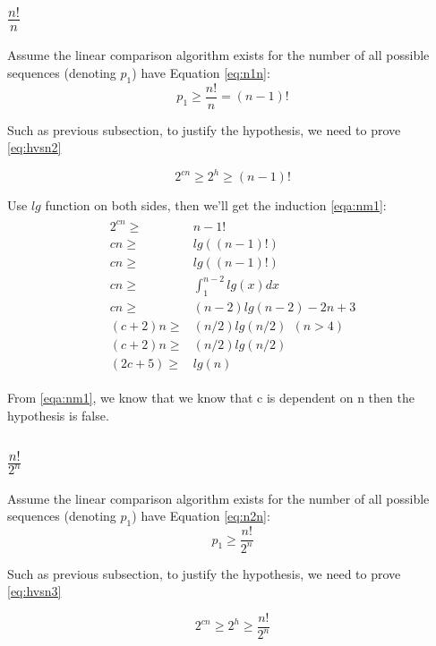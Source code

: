 \documentclass[oneside]{homework} %
\begin{document}
\subsection{$\frac{n!}{n}$}

Assume the linear comparison algorithm exists for the number of all possible sequences (denoting $p_{1}$) have Equation \ref{eq:n1n}:
\begin{equation}
  \label{eq:n1n}
  p_{1}\geq\frac{n!}{n} =  (n-1)!
\end{equation}

Such as previous subsection, to justify the hypothesis, we need to prove \ref{eq:hvsn2}

\begin{equation}
  2^{cn} \geq 2^{h} \geq (n-1)!
  \label{eq:hvsn2}
\end{equation}

Use $lg$ function on both sides, then we'll get the induction \ref{eqa:nm1}:
\begin{eqnarray}
  \begin{split}
	2^{cn} \geq& n-1! \\
	cn \geq& lg((n-1)!) \\
	cn \geq& lg((n-1)!) \\
	cn \geq& \int_{1}^{n-2}lg(x)dx  \\
	cn \geq& (n-2)lg(n-2) - 2n +3 \\
	(c+2)n \geq& (n/2)lg(n/2) ~ ~ (n>4)\\
	(c+2)n \geq& (n/2)lg(n/2) \\
	(2c+5) \geq& lg(n)
  \end{split}
  \label{eqa:nm1}
\end{eqnarray}

From \ref{eqa:nm1}, we know that we know that c is dependent on n then the hypothesis is false.

\subsection{$\frac{n!}{2^{n}}$}

Assume the linear comparison algorithm exists for the number of all possible sequences (denoting $p_{1}$) have Equation \ref{eq:n2n}:
\begin{equation}
  \label{eq:n2n}
  p_{1}\geq\frac{n!}{2^{n}}
\end{equation}

Such as previous subsection, to justify the hypothesis, we need to prove \ref{eq:hvsn3}

\begin{equation}
  2^{cn} \geq 2^{h} \geq \frac{n!}{2^{n}}  
  \label{eq:hvsn3}
\end{equation}
\end{document}
